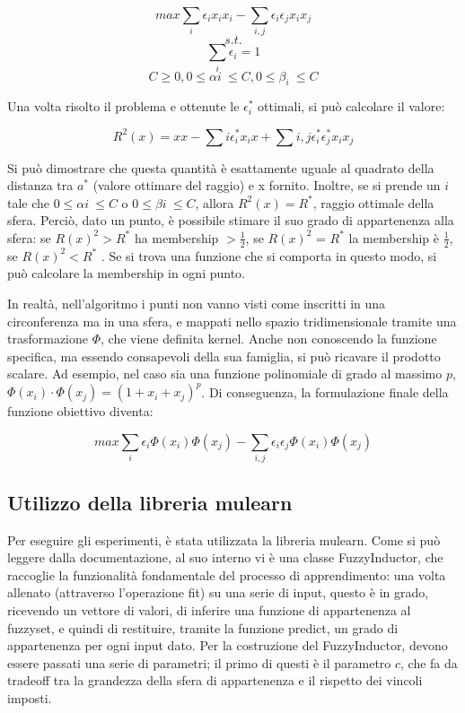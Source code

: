 \documentclass[12pt,a4paper]{report}
\begin{document}
\[ max \sum_{i}\epsilon_ix_ix_i - \sum_{i,j}\epsilon_i\epsilon_jx_ix_j\]
\[s.t.\]
\[\sum_i\epsilon_i = 1\]
\[ C \geq 0, 0 \leq \alpha{i}\ \leq C , 0 \leq \beta_{i}\ \leq C \]

Una volta risolto il problema e ottenute le $\epsilon_i^*$ ottimali, si può calcolare il valore:

\[ R^2(x) = xx - \sum{i}\epsilon_i^*x_ix + \sum{i,j}\epsilon_i^*\epsilon_j^*x_ix_j\]

Si può dimostrare che questa quantità è esattamente uguale al quadrato della distanza tra $a^*$ (valore ottimare del raggio) e x fornito. Inoltre,  se si prende un $i$ tale che $0 \leq \alpha{i}\ \leq C$ o $0 \leq \beta{i}\ \leq C$,  allora $R^2(x) = R^*$, raggio ottimale della sfera.
Perciò, dato un punto, è possibile stimare il suo grado di appartenenza alla sfera: se $R(x)^2 > R^*$ ha membership $>\frac{1}{2}$, se $R(x)^2$ = $R^*$ la membership è  $\frac{1}{2}$, se $R(x)^2  <R^*$ .
Se si trova una funzione che si comporta in questo modo, si può calcolare la membership in ogni punto.

In realtà, nell'algoritmo i punti non vanno visti come inscritti in una circonferenza ma in una sfera, e mappati nello spazio tridimensionale tramite una trasformazione $\Phi$, che viene definita kernel. Anche non conoscendo la funzione specifica, ma essendo consapevoli della sua famiglia, si può ricavare il prodotto scalare. Ad esempio, nel caso sia una funzione polinomiale di grado al massimo $p$, $\Phi(x_i)\cdot \Phi(x_j) = (1 + x_i + x_j)^p$.
Di conseguenza, la formulazione finale della funzione obiettivo diventa:

\[ max \sum_{i}\epsilon_i\Phi(x_i)\Phi(x_j) - \sum_{i,j}\epsilon_i\epsilon_j\Phi(x_i)\Phi(x_j)\]

\subsection{Utilizzo della libreria mulearn}

Per eseguire gli esperimenti, è stata utilizzata la libreria mulearn.\cite{mulearn}
Come si può leggere dalla documentazione, al suo interno vi è una classe FuzzyInductor, che raccoglie la funzionalità fondamentale del processo di apprendimento: una volta allenato (attraverso l'operazione fit) su una serie di input, questo è in grado, ricevendo un vettore di valori, di inferire una funzione di appartenenza al fuzzyset, e quindi di restituire, tramite la funzione predict, un grado di appartenenza per ogni input dato.
Per la costruzione del FuzzyInductor, devono essere passati una serie di parametri; il primo di questi è il parametro $c$, che fa da tradeoff tra la grandezza della sfera di appartenenza e il rispetto dei vincoli imposti. 
\end{document}
